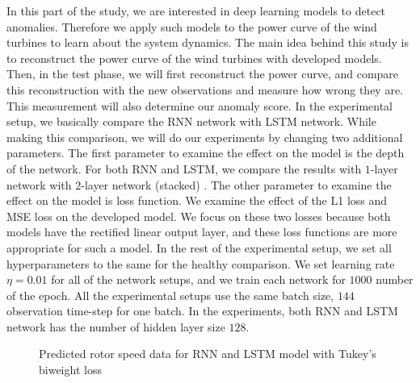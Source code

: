In this part of the study, we are interested in deep learning models to detect anomalies. 
Therefore we apply such models to the power curve of the wind turbines to learn about the system dynamics.
The main idea behind this study is to reconstruct the power curve of the wind turbines with developed models.
Then, in the test phase, we will first reconstruct the power curve, and compare this reconstruction with the new observations and measure how wrong they are.
This measurement will also determine our anomaly score.
In the experimental setup, we basically compare the RNN network with LSTM network.
While making this comparison, we will do our experiments by changing two additional parameters.
The first parameter to examine the effect on the model is the depth of the network.
For both RNN and LSTM, we compare the results with $1$-layer network with $2$-layer network (stacked) \cite{malhotra2015long}.
The other parameter to examine the effect on the model is loss function.
We examine the effect of the L1 loss and MSE loss on the developed model.
We focus on these two losses because both models have the rectified linear output layer, and these loss functions are more appropriate for such a model. 
In the rest of the experimental setup, we set all hyperparameters to the same for the healthy comparison.
We set learning rate $\eta = 0.01$ for all of the network setups, and we train each network for $1000$ number of the epoch. All the experimental setups use the same batch size, $144$ observation time-step for one batch. In the experiments, both RNN and LSTM network has the number of hidden layer size $128$.

\begin{figure}
\centering
    
    
    \caption{Predicted rotor speed data for RNN and LSTM model with Tukey's biweight loss}
    \label{fig:deep_rotors}
\end{figure}

